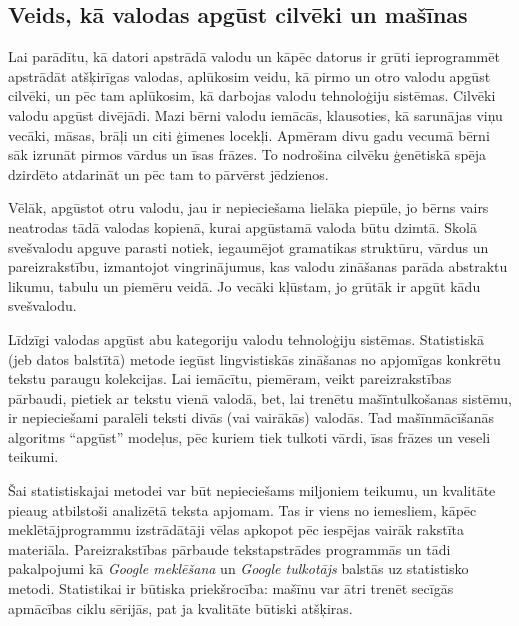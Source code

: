\begin{multicols}{2}
\subsection{Veids, kā valodas apgūst cilvēki un mašīnas}

Lai parādītu, kā datori apstrādā valodu un kāpēc datorus ir grūti ieprogrammēt apstrādāt atšķirīgas valodas, aplūkosim veidu, kā pirmo un otro valodu apgūst cilvēki, un pēc tam aplūkosim, kā darbojas valodu tehnoloģiju sistēmas. 
%
%
Cilvēki valodu apgūst divējādi.
Mazi bērni valodu iemācās, klausoties, kā sarunājas viņu vecāki, māsas, brāļi un citi ģimenes locekļi. 
Apmēram divu gadu vecumā bērni sāk izrunāt pirmos vārdus un īsas frāzes. 
To nodrošina cilvēku ģenētiskā spēja dzirdēto atdarināt un pēc tam to pārvērst jēdzienos. 


Vēlāk, apgūstot otru valodu, jau ir nepieciešama lielāka piepūle, jo bērns vairs neatrodas tādā valodas kopienā, kurai apgūstamā valoda būtu dzimtā. 
Skolā svešvalodu apguve parasti notiek, iegaumējot gramatikas struktūru, vārdus un pareizrakstību, izmantojot vingrinājumus, kas valodu zināšanas parāda abstraktu likumu, tabulu un piemēru veidā. 
Jo vecāki kļūstam, jo grūtāk ir apgūt kādu svešvalodu.

Līdzīgi valodas apgūst abu kategoriju valodu tehnoloģiju sistēmas.
Statistiskā (jeb datos balstītā) metode iegūst lingvistiskās zināšanas no apjomīgas konkrētu tekstu paraugu kolekcijas. 
Lai iemācītu, piemēram, veikt pareizrakstības pārbaudi, pietiek ar tekstu vienā valodā, bet, lai trenētu mašīntulkošanas sistēmu, ir nepieciešami paralēli teksti divās (vai vairākās) valodās. 
Tad mašīnmācīšanās algoritms ``apgūst'' modeļus, pēc kuriem tiek tulkoti vārdi, īsas frāzes un veseli teikumi. 


Šai statistiskajai metodei var būt nepieciešams miljoniem teikumu, un kvalitāte pieaug atbilstoši analizētā teksta apjomam. 
Tas ir viens no iemesliem, kāpēc meklētājprogrammu izstrādātāji vēlas apkopot pēc iespējas vairāk rakstīta materiāla. 
Pareizrakstības pārbaude tekstapstrādes programmās un tādi pakalpojumi kā \textit{Google meklēšana} un \textit{Google tulkotājs} balstās uz statistisko metodi. 
Statistikai ir būtiska priekšrocība: mašīnu var ātri trenēt secīgās apmācības ciklu sērijās, pat ja kvalitāte būtiski atšķiras.


\end{multicols}
